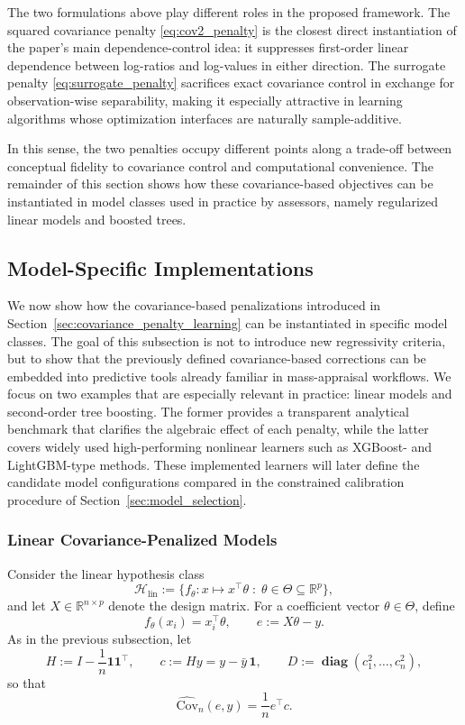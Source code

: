 \documentclass[12pt, draft]{article}
\theoremstyle{plain}
\theoremstyle{definition}
\newcommand{\R}{\mathbb{R}}
\newcommand{\1}{\mathbf{1}}
\newcommand{\Cov}{\text{Cov}}
\renewcommand{\H}{\mathcal{H}}
\renewcommand{\R}{\mathbb{R}}
\newcommand{\diag}{\mathbf{\operatorname{diag}}}
\begin{document}
{The two formulations above play different roles in the proposed framework. The squared covariance penalty \eqref{eq:cov2_penalty} is the closest direct instantiation of the paper's main dependence-control idea: it suppresses first-order linear dependence between log-ratios and log-values in either direction. The surrogate penalty \eqref{eq:surrogate_penalty} sacrifices exact covariance control in exchange for observation-wise separability, making it especially attractive in learning algorithms whose optimization interfaces are naturally sample-additive.

In this sense, the two penalties occupy different points along a trade-off between conceptual fidelity to covariance control and computational convenience. The remainder of this section shows how these covariance-based objectives can be instantiated in model classes used in practice by assessors, namely regularized linear models and boosted trees.

\subsection{Model-Specific Implementations}
\label{sec:model_specific_implementations}

We now show how the covariance-based penalizations introduced in Section~\ref{sec:covariance_penalty_learning} can be instantiated in specific model classes. The goal of this subsection is not to introduce new regressivity criteria, but to show that the previously defined covariance-based corrections can be embedded into predictive tools already familiar in mass-appraisal workflows. We focus on two examples that are especially relevant in practice: linear models and second-order tree boosting. The former provides a transparent analytical benchmark that clarifies the algebraic effect of each penalty, while the latter covers widely used high-performing nonlinear learners such as XGBoost- and LightGBM-type methods. These implemented learners will later define the candidate model configurations compared in the constrained calibration procedure of Section~\ref{sec:model_selection}.

\subsubsection{Linear Covariance-Penalized Models}
\label{subsec:linear_models}

Consider the linear hypothesis class
\[
\H_{\mathrm{lin}} := \{f_\theta : x \mapsto x^\top \theta \;:\; \theta \in \Theta \subseteq \R^p\},
\]
and let $X \in \R^{n\times p}$ denote the design matrix. For a coefficient vector $\theta \in \Theta$, define
\[
f_\theta(x_i) = x_i^\top \theta,
\qquad
e := X\theta - y.
\]
As in the previous subsection, let
\[
H := I - \frac{1}{n}\mathbf{1}\mathbf{1}^\top,
\qquad
c := Hy = y - \bar y\,\mathbf{1},
\qquad
D := \diag(c_1^2,\dots,c_n^2),
\]
so that
\[
\widehat{\Cov}_n(e,y)
=
\frac{1}{n}e^\top c.
\]

}
\end{document}
